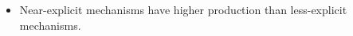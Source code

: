\begin{BlueBox}
    \vskip-1cm
    \begin{block}{}
        \begin{itemize}
            \item Near-explicit mechanisms have higher  production than less-explicit mechanisms. \vspace{10mm}
        \end{itemize}        
    \end{block}
\end{BlueBox}
